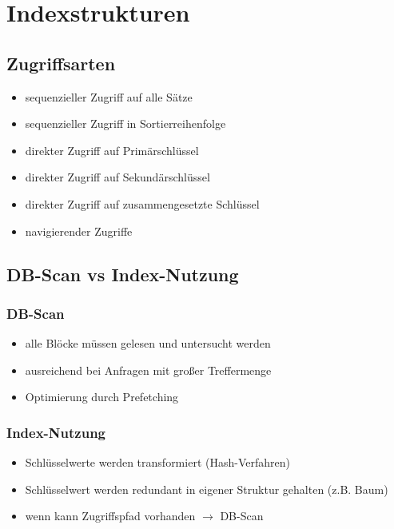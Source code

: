 \documentclass[a4paper]{article}
\begin{document}
\vspace{5mm}

\section{Indexstrukturen}

\subsection{Zugriffsarten}
\begin{itemize}
    \item sequenzieller Zugriff auf alle Sätze
    \item sequenzieller Zugriff in Sortierreihenfolge
    \item direkter Zugriff auf Primärschlüssel
    \item direkter Zugriff auf Sekundärschlüssel
    \item direkter Zugriff auf zusammengesetzte Schlüssel
    \item navigierender Zugriffe
\end{itemize}

\subsection{DB-Scan vs Index-Nutzung}

    \subsubsection{DB-Scan}
    \begin{itemize}
        \item alle Blöcke müssen gelesen und untersucht werden
        \item ausreichend bei Anfragen mit großer Treffermenge
        \item Optimierung durch Prefetching
    \end{itemize}
    
    \subsubsection{Index-Nutzung}
    \begin{itemize}
        \item Schlüsselwerte werden transformiert (Hash-Verfahren)
        \item Schlüsselwert werden redundant in eigener Struktur gehalten (z.B. Baum)
        \item wenn kann Zugriffspfad vorhanden $\to$ DB-Scan
    \end{itemize}
\end{document}
